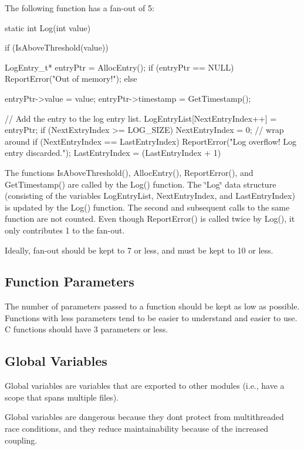 The following function has a fan-\/out of 5\+: \begin{DoxyVerb}static int Log(int value)
{
    if (IsAboveThreshold(value))
    {
        LogEntry_t* entryPtr = AllocEntry();
        if (entryPtr == NULL)
        {
            ReportError("Out of memory!");
        }
        else
        {
            entryPtr->value = value;
            entryPtr->timestamp = GetTimestamp();

            // Add the entry to the log entry list.
            LogEntryList[NextEntryIndex++] = entryPtr;
            if (NextExtryIndex >= LOG_SIZE)
            {
                NextEntryIndex = 0; // wrap around
            }
            if (NextEntryIndex == LastEntryIndex)
            {
                ReportError("Log overflow! Log entry discarded.");
                LastEntryIndex = (LastEntryIndex + 1) %
            }
        }
    }
}\end{DoxyVerb}


The functions Is\+Above\+Threshold(), Alloc\+Entry(), Report\+Error(), and Get\+Timestamp() are called by the Log() function. The \char`\"{}\+Log\char`\"{} data structure (consisting of the variables Log\+Entry\+List, Next\+Entry\+Index, and Last\+Entry\+Index) is updated by the Log() function. The second and subsequent calls to the same function are not counted. Even though Report\+Error() is called twice by Log(), it only contributes 1 to the fan-\/out.

Ideally, fan-\/out should be kept to 7 or less, and must be kept to 10 or less.\hypertarget{ccoding_stds_main_cstdsFunctionParameter}{}\subsection{Function Parameters}\label{ccoding_stds_main_cstdsFunctionParameter}
The number of parameters passed to a function should be kept as low as possible. Functions with less parameters tend to be easier to understand and easier to use. C functions should have 3 parameters or less.\hypertarget{ccoding_stds_main_cstdsGlobalVariables}{}\subsection{Global Variables}\label{ccoding_stds_main_cstdsGlobalVariables}
Global variables are variables that are exported to other modules (i.\+e., have a scope that spans multiple files).

Global variables are dangerous because they don\textquotesingle{}t protect from multithreaded race conditions, and they reduce maintainability because of the increased coupling.

